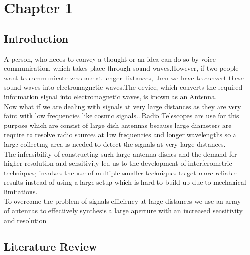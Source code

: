 \documentclass[a4paper, twoside] {thesis}
\begin{document}
	
\chapter{Chapter 1}
\section{Introduction}
A person, who needs to convey a thought or an idea can do so by voice communication, which takes place through sound waves.However, if two people want to communicate who are at longer distances, then we have to convert these sound waves into electromagnetic waves.The device, which converts the required information signal into electromagnetic waves, is known as an Antenna.\\
Now what if we are dealing with signals at very large distances as they are very faint with low frequencies like cosmic signals...Radio Telescopes are use for this purpose which are consist of large dish antennas because large diameters are require to resolve radio sources at low frequencies and longer wavelengths so a large collecting area is needed to detect the signals at very large distances.\\
The infeasibility of constructing such large antenna dishes and the demand for higher resolution and sensitivity led us to the development of interferometric techniques; involves the use of multiple smaller techniques to get more reliable results instead of using a large setup which is hard to build up due to mechanical limitations.\\
To overcome the problem of signals efficiency at large distances we use an array of antennas to effectively synthesis a large aperture with an increased sensitivity and resolution.
 
\section{Literature Review}
\end{document}

